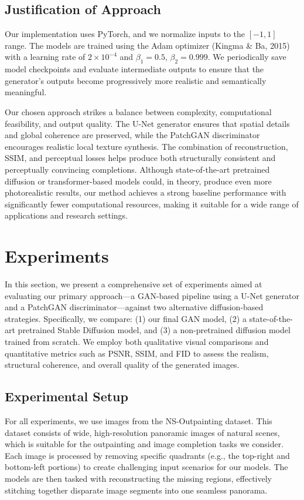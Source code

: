 \documentclass[sigconf]{acmart}
\begin{document}
\subsection*{Justification of Approach}
Our implementation uses PyTorch, and we normalize inputs to the $[-1, 1]$ range. The models are trained using the Adam optimizer (Kingma \& Ba, 2015) with a learning rate of $2 \times 10^{-4}$ and $\beta_1 = 0.5$, $\beta_2 = 0.999$. We periodically save model checkpoints and evaluate intermediate outputs to ensure that the generator’s outputs become progressively more realistic and semantically meaningful. 

Our chosen approach strikes a balance between complexity, computational feasibility, and output quality. The U-Net generator ensures that spatial details and global coherence are preserved, while the PatchGAN discriminator encourages realistic local texture synthesis. The combination of reconstruction, SSIM, and perceptual losses helps produce both structurally consistent and perceptually convincing completions. Although state-of-the-art pretrained diffusion or transformer-based models could, in theory, produce even more photorealistic results, our method achieves a strong baseline performance with significantly fewer computational resources, making it suitable for a wide range of applications and research settings.

\section*{Experiments}

In this section, we present a comprehensive set of experiments aimed at evaluating our primary approach—a GAN-based pipeline using a U-Net generator and a PatchGAN discriminator—against two alternative diffusion-based strategies. Specifically, we compare: (1) our final GAN model, (2) a state-of-the-art pretrained Stable Diffusion model, and (3) a non-pretrained diffusion model trained from scratch. We employ both qualitative visual comparisons and quantitative metrics such as PSNR, SSIM, and FID to assess the realism, structural coherence, and overall quality of the generated images.

\subsection*{Experimental Setup}

For all experiments, we use images from the NS-Outpainting dataset. This dataset consists of wide, high-resolution panoramic images of natural scenes, which is suitable for the outpainting and image completion tasks we consider. Each image is processed by removing specific quadrants (e.g., the top-right and bottom-left portions) to create challenging input scenarios for our models. The models are then tasked with reconstructing the missing regions, effectively stitching together disparate image segments into one seamless panorama.
\end{document}
